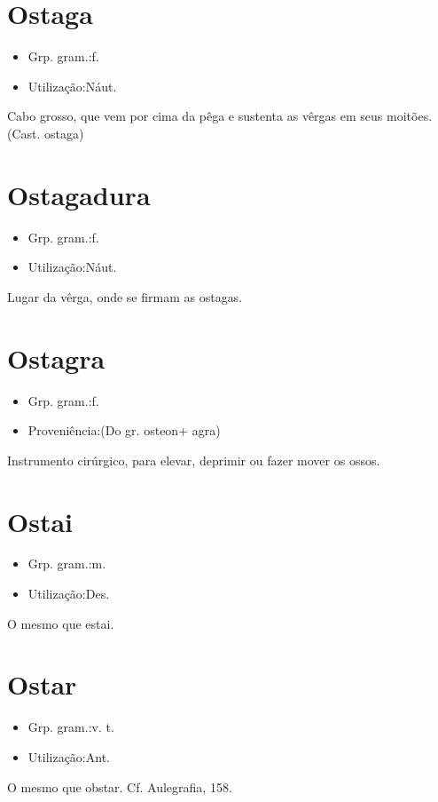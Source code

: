 \section{Ostaga}
\begin{itemize}
\item {Grp. gram.:f.}
\end{itemize}
\begin{itemize}
\item {Utilização:Náut.}
\end{itemize}
Cabo grosso, que vem por cima da pêga e sustenta as vêrgas em seus moitões.
(Cast. \textunderscore ostaga\textunderscore )
\section{Ostagadura}
\begin{itemize}
\item {Grp. gram.:f.}
\end{itemize}
\begin{itemize}
\item {Utilização:Náut.}
\end{itemize}
Lugar da vêrga, onde se firmam as ostagas.
\section{Ostagra}
\begin{itemize}
\item {Grp. gram.:f.}
\end{itemize}
\begin{itemize}
\item {Proveniência:(Do gr. \textunderscore osteon\textunderscore  + \textunderscore agra\textunderscore )}
\end{itemize}
Instrumento cirúrgico, para elevar, deprimir ou fazer mover os ossos.
\section{Ostai}
\begin{itemize}
\item {Grp. gram.:m.}
\end{itemize}
\begin{itemize}
\item {Utilização:Des.}
\end{itemize}
O mesmo que \textunderscore estai\textunderscore .
\section{Ostar}
\begin{itemize}
\item {Grp. gram.:v. t.}
\end{itemize}
\begin{itemize}
\item {Utilização:Ant.}
\end{itemize}
O mesmo que \textunderscore obstar\textunderscore . Cf. \textunderscore Aulegrafia\textunderscore , 158.
